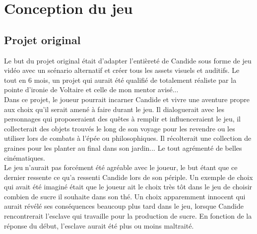 \documentclass[11pt]{article}
\begin{document}
\section{Conception du jeu}

\subsection{Projet original}
Le but du projet original était d'adapter l'entièreté de Candide sous forme de jeu vidéo avec un scénario alternatif et créer tous les assets visuels et auditifs. Le tout en 6 mois, un projet qui aurait été qualifié de totalement réaliste par la pointe d'ironie de Voltaire et celle de mon mentor avisé...\\

Dans ce projet, le joueur pourrait incarner Candide et vivre une aventure propre aux choix qu'il serait amené à faire durant le jeu. Il dialoguerait avec les personnages qui proposeraient des quêtes à remplir et influenceraient le jeu, il collecterait des objets trouvés le long de son voyage pour les revendre ou les utiliser lors de combats à l'épée ou philosophiques. Il récolterait une collection de graines pour les planter au final dans son jardin... Le tout agrémenté de belles cinématiques.\\ Le jeu n'aurait pas forcément été agréable avec le joueur, le but étant que ce dernier ressente ce qu'a ressenti Candide lors de son périple. Un exemple de choix qui avait été imaginé était  que le joueur ait le choix très tôt dans le jeu de choisir combien de sucre il souhaite dans son thé. Un choix apparemment innocent qui aurait révélé ses conséquences beaucoup plus tard dans le jeu, lorsque Candide rencontrerait l'esclave qui travaille pour la production de sucre. En fonction de la réponse du début, l'esclave aurait été plus ou moins maltraité. 
\end{document}
